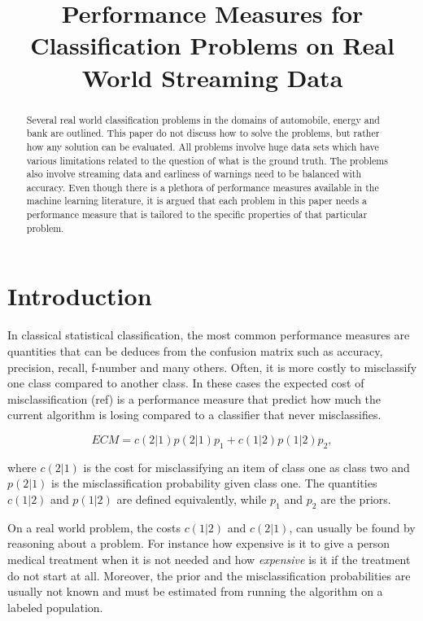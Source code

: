 \documentclass{article}
\title{Performance Measures for Classification Problems on Real World Streaming Data}
\date{}
\theoremstyle{theorem}
\theoremstyle{definition}
\begin{document}
\maketitle

\begin{abstract}
Several real world classification problems in the domains of automobile, energy and bank are outlined.  This paper do not discuss how to solve the problems, but rather how any solution can be evaluated.  All problems involve huge data sets which have various limitations related to the question of what is the ground truth. The problems also involve streaming data and earliness of warnings need to be balanced with accuracy.  Even though there is a plethora of performance measures available in the machine learning literature, it is argued that each problem in this paper needs a performance measure that is tailored to the specific properties of that particular problem.
\end{abstract}

\section{Introduction}

In classical statistical classification, the most common performance measures are quantities that can be deduces from the confusion matrix such as accuracy, precision, recall, f-number and many others. Often, it is more costly to misclassify one class compared to another class. In these cases the expected cost of misclassification (ref) is a performance measure that predict how much the current algorithm is losing compared to a classifier that never misclassifies.  

\begin{equation}
\label{eq:ecm}
ECM =  c(2|1)p(2|1)p_1  + c(1|2)p(1|2)p_2,
\end{equation}

where $c(2|1)$ is the cost for misclassifying an item of class one as class two and $p(2|1)$ is the misclassification probability given class one.  The quantities $c(1|2)$ and $p(1|2)$ are defined equivalently, while $p_1$ and $p_2$ are the priors.  

On a real world problem, the costs $c(1|2)$ and $c(2|1)$, can usually be found by reasoning about a problem.  For instance how expensive is it to give a person medical treatment when it is not needed and how \emph{expensive} is it if the treatment do not start at all.  Moreover, the prior and the misclassification probabilities are usually not known and must be estimated from running the algorithm on a labeled population.   
\end{document}
